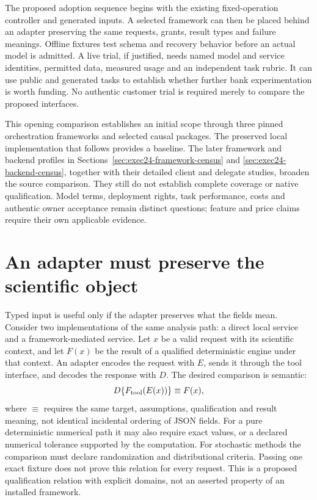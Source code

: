 The proposed adoption sequence begins with the existing fixed-operation
controller and generated inputs. A selected framework can then be placed
behind an adapter preserving the same requests, grants, result types and
failure meanings. Offline fixtures test schema and recovery behavior before
an actual model is admitted. A live trial, if justified, needs named model
and service identities, permitted data, measured usage and an independent
task rubric. It can use public and generated tasks to establish whether
further bank experimentation is worth funding. No authentic customer
trial is required merely to compare the proposed interfaces.

This opening comparison establishes an initial scope through three pinned
orchestration frameworks and selected causal packages. The preserved local
implementation that follows provides a baseline. The later framework and
backend profiles in Sections~\ref{sec:exec24-framework-census} and
\ref{sec:exec24-backend-census}, together with their detailed client and
delegate studies, broaden the source comparison. They still do not establish
complete coverage or native qualification. Model terms, deployment rights,
task performance, costs and authentic owner acceptance remain distinct
questions; feature and price claims require their own applicable evidence.
\citep{exec14_l6_design,exec14_l6_local}

\label{exec14:l6-extension-end}


\section{An adapter must preserve the scientific object}
\label{exec14:l6-adapter}

Typed input is useful only if the adapter preserves what the fields mean.
Consider two implementations of the same analysis path: a direct local
service and a framework-mediated service. Let $x$ be a valid request with
its scientific context, and let $F(x)$ be the result of a qualified
deterministic engine under that context. An adapter encodes the request
with $E$, sends it through the tool interface, and decodes the response
with $D$. The desired comparison is semantic:
\begin{equation}
 D\{F_{\rm tool}(E(x))\}\equiv F(x),
 \label{exec14:l6-commute}
\end{equation}
where $\equiv$ requires the same target, assumptions, qualification and
result meaning, not identical incidental ordering of JSON fields. For a
pure deterministic numerical path it may also require exact values, or a
declared numerical tolerance supported by the computation. For stochastic
methods the comparison must declare randomization and distributional
criteria. Passing one exact fixture does not prove this relation for every
request. This is a proposed qualification relation with explicit domains,
not an asserted property of an installed framework.
\citep{exec14_l6_adapter_exact}

